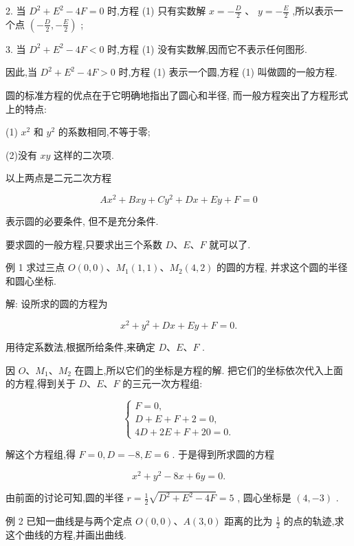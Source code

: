 \documentclass[lang=cn,newtx,10.5pt,scheme=chinese]{elegantbook}
\begin{document}
2. 当 \({D}^{2} + {E}^{2} - {4F} = 0\) 时,方程 (1) 只有实数解 \(x = - \frac{D}{2}\) 、 \(y = - \frac{E}{2}\) ,所以表示一个点 \(\left( {-\frac{D}{2}, - \frac{E}{2}}\right)\) ;

3. 当 \({D}^{2} + {E}^{2} - {4F} < 0\) 时,方程 (1) 没有实数解,因而它不表示任何图形.

因此,当 \({D}^{2} + {E}^{2} - {4F} > 0\) 时,方程 (1) 表示一个圆,方程 (1) 叫做圆的一般方程.

圆的标准方程的优点在于它明确地指出了圆心和半径, 而一般方程突出了方程形式上的特点:

(1) \({x}^{2}\) 和 \({y}^{2}\) 的系数相同,不等于零;

(2)没有 \({xy}\) 这样的二次项.

以上两点是二元二次方程

\[
  A{x}^{2} + {Bxy} + C{y}^{2} + {Dx} + {Ey} + F = 0
\]

表示圆的必要条件, 但不是充分条件.

要求圆的一般方程,只要求出三个系数 \(D\text{、}E\text{、}F\) 就可以了.

例 1 求过三点 \(O\left( {0,0}\right) \text{、}{M}_{1}\left( {1,1}\right) \text{、}{M}_{2}\left( {4,2}\right)\) 的圆的方程, 并求这个圆的半径和圆心坐标.

解: 设所求的圆的方程为

\[
    {x}^{2} + {y}^{2} + {Dx} + {Ey} + F = 0.
\]

用待定系数法,根据所给条件,来确定 \(D\text{、}E\text{、}F\) .

因 \(O\text{、}{M}_{1}\text{、}{M}_{2}\) 在圆上,所以它们的坐标是方程的解. 把它们的坐标依次代入上面的方程,得到关于 \(D\text{、}E\text{、}F\) 的三元一次方程组:

\[
  \left\{ \begin{array}{l} F = 0, \\ D + E + F + 2 = 0, \\ {4D} + {2E} + F + {20} = 0. \end{array}\right.
\]

解这个方程组,得 \(F = 0,D = - 8,E = 6\) . 于是得到所求圆的方程

\[
    {x}^{2} + {y}^{2} - {8x} + {6y} = 0.
\]

由前面的讨论可知,圆的半径 \(r = \frac{1}{2}\sqrt{{D}^{2} + {E}^{2} - {4F}} = 5\) , 圆心坐标是 \(\left( {4, - 3}\right)\) .

例 2 已知一曲线是与两个定点 \(O\left( {0,0}\right) \text{、}A\left( {3,0}\right)\) 距离的比为 \(\frac{1}{2}\) 的点的轨迹,求这个曲线的方程,并画出曲线.
\end{document}
